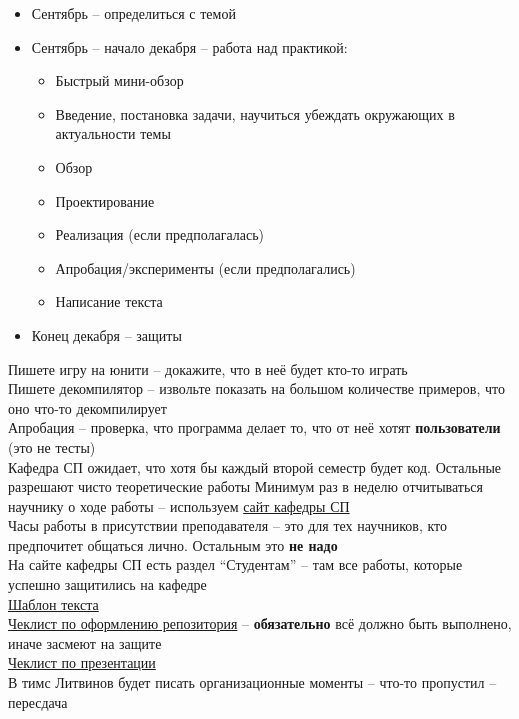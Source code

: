\begin{itemize}
	\item Сентябрь -- определиться с темой
	\item Сентябрь -- начало декабря -- работа над практикой:
	\begin{itemize}
		\item Быстрый мини-обзор
		\item Введение, постановка задачи, научиться убеждать окружающих в актуальности темы
		\item Обзор
		\item Проектирование
		\item Реализация (если предполагалась)
		\item Апробация/эксперименты (если предполагались)
		\item Написание текста
	\end{itemize}
	\item Конец декабря -- защиты
\end{itemize}
Пишете игру на юнити -- докажите, что в неё будет кто-то играть \\
Пишете декомпилятор -- извольте показать на большом количестве примеров, что оно что-то декомпилирует \\
Апробация -- проверка, что программа делает то, что от неё хотят \textbf{пользователи} (это не тесты) \\
Кафедра СП ожидает, что хотя бы каждый второй семестр будет код. Остальные разрешают чисто теоретические работы
Минимум раз в неделю отчитываться научнику о ходе работы -- используем \href{https://se.math.spbu.ru/practice}{сайт кафедры СП} \\
Часы работы в присутствии преподавателя -- это для тех научников, кто предпочитет общаться лично. Остальным это \textbf{не надо} \\
На сайте кафедры СП есть раздел ``Студентам'' -- там все работы, которые успешно защитились на кафедре \\
\href{https://github.com/spbu-se/matmex-diploma-template}{Шаблон текста} \\
\href{https://github.com/yrii-litvinov/courses/blob/master/additional/repo-checklist/repo-checklist.pdf}{Чеклист по оформлению репозитория} -- \textbf{обязательно} всё должно быть выполнено, иначе засмеют на защите \\
\href{https://goo.gl/UeDRff}{Чеклист по презентации} \\
В тимс Литвинов будет писать организационные моменты -- что-то пропустил -- пересдача \\
